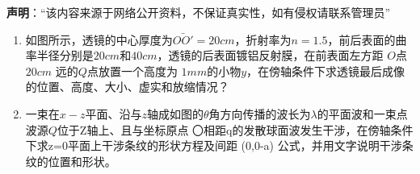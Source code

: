 

\textbf{声明}：“该内容来源于网络公开资料，不保证真实性，如有侵权请联系管理员”
\begin{enumerate}
\item 如图所示，透镜的中心厚度为$\bar{OO'}=20cm$，折射率为$n=1.5$，前后表面的曲率半径分别是$20cm$和$40cm$，透镜的后表面镀铝反射膜，在前表面左方距 $O$点 $20cm$ 远的$Q$点放置一个高度为 $1mm $的小物$y$，在傍轴条件下求透镜最后成像的位置、高度、大小、虚实和放缩情况？
\item 一束在$x-z$平面、沿与$z$轴成如图的$\theta$角方向传播的波长为$\lambda$的平面波和一束点波源$Q$位于Z轴上、且与坐标原点 〇相距q的发散球面波发生干涉，在傍轴条件下求z=0平面上干涉条纹的形状方程及间距
(0,0-a)
公式，并用文字说明干涉条纹的位置和形状。
\end{enumerate}